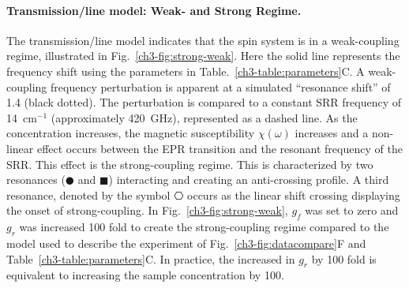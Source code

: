 \noindent \paragraph*{Transmission\-/line model: Weak- and Strong Regime.} The transmission\-/line model indicates that the spin system is in a weak-coupling regime, illustrated in Fig.~\ref{ch3-fig:strong-weak}. Here the solid line represents the frequency shift using the parameters in Table.~\ref{ch3-table:parameters}C. A weak-coupling frequency perturbation is apparent at a simulated ``resonance shift'' of 1.4 (black dotted). The perturbation is compared to a constant SRR frequency of 14~cm$^{-1}$ (approximately 420~GHz), represented as a dashed line. As the concentration increases, the magnetic susceptibility $\chi(\omega)$ increases and a non-linear effect occurs between the EPR transition and the resonant frequency of the SRR. This effect is the strong-coupling regime. This is characterized by two resonances ($\CIRCLE$ and $\blacksquare$) interacting and creating an anti-crossing profile. A third resonance, denoted by the symbol $\hexagon$ occurs as the linear shift crossing displaying the onset of strong-coupling. In Fig.~\ref{ch3-fig:strong-weak}, $g_f$ was set to zero and $g_r$ was increased 100 fold to create the strong-coupling regime compared to the model used to describe the experiment of Fig.~\ref{ch3-fig:datacompare}F and Table~\ref{ch3-table:parameters}C. In practice, the increased in $g_r$ by 100 fold is equivalent to increasing the sample concentration by 100.

